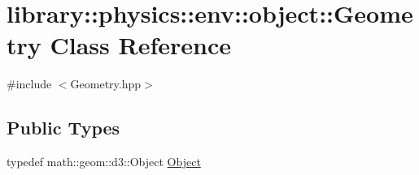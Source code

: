 \hypertarget{classlibrary_1_1physics_1_1env_1_1object_1_1_geometry}{}\section{library\+:\+:physics\+:\+:env\+:\+:object\+:\+:Geometry Class Reference}
\label{classlibrary_1_1physics_1_1env_1_1object_1_1_geometry}


{\ttfamily \#include $<$Geometry.\+hpp$>$}

\subsection*{Public Types}
\begin{DoxyCompactItemize}
\item 
typedef math\+::geom\+::d3\+::\+Object \hyperlink{classlibrary_1_1physics_1_1env_1_1object_1_1_geometry_a4889a934df09768235fa2d89d0b0b0d6}{Object}
\end{DoxyCompactItemize}
